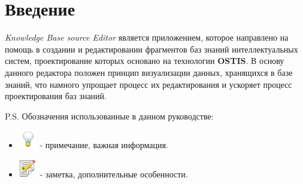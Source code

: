 \newpage
\section{Введение}

\textit{Knowledge Base source Editor} является приложением, которое направлено на помощь в создании и редактировании фрагментов баз знаний интеллектуальных систем, проектирование которых основано на технологии \textbf{OSTIS}. В основу данного редактора положен принцип визуализации данных, хранящихся в базе знаний, что намного упрощает процесс их редактирования и ускоряет процесс проектирования баз знаний.

P.S. Обозначения использованные в данном руководстве:
\begin{itemize}
	\item
		\includegraphics[width=30px, height=30px]{../images/lamp.png}
 - примечание, важная информация.
	\item 
		\includegraphics[width=30px, height=30px]{../images/note.png}
 - заметка, дополнительные особенности.
\end{itemize}
 


